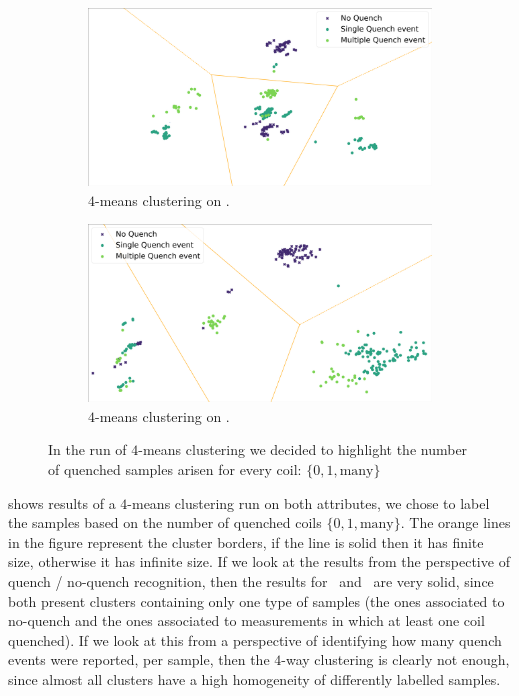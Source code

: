 \begin{figure}[!ht]
	\centering
	\begin{subfigure}{0.6\linewidth}
		\centering
		\includegraphics[width=\linewidth]{img/clustering_an_qlp_4c.png}
		\caption{$4$-means clustering on \an.}
	\end{subfigure}
	\begin{subfigure}{0.6\linewidth}
		\centering
		\includegraphics[width=\linewidth]{img/clustering_cnmod_qlp_4c.png}
		\caption{$4$-means clustering on \cnmod.}
	\end{subfigure}
	\caption{In the run of $4$-means clustering we decided to highlight the number of quenched
	samples arisen for every coil: $\{0, 1, \text{many}\}$} \label{fig:4-means-results}
\end{figure}

 shows results of a $4$-means clustering run on both attributes, we chose
to label the samples based on the number of quenched coils $\{0, 1, \text{many}\}$. The orange lines
in the figure represent the cluster borders, if the line is solid then it has finite size, otherwise
it has infinite size. If we look at the results from the perspective of quench / no-quench
recognition, then the results for \an\ and \cnmod\ are very solid, since both present clusters
containing only one type of samples (the ones associated to no-quench and the ones associated to
measurements in which at least one coil quenched). If we look at this from a perspective of
identifying how many quench events were reported, per sample, then the $4$-way clustering is clearly
not enough, since almost all clusters have a high homogeneity of differently labelled samples.

